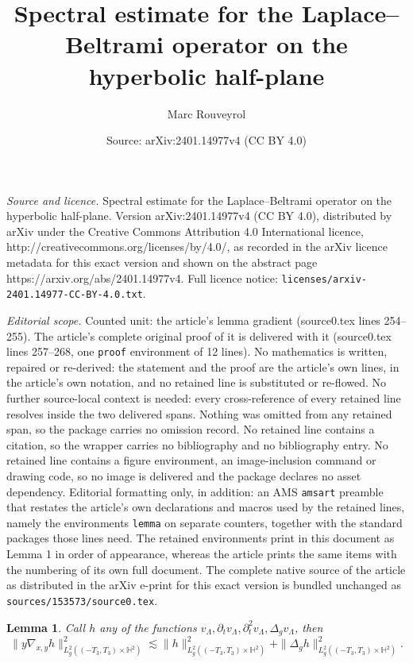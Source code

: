 \documentclass[10pt,a4paper]{amsart}
\title{Spectral estimate for the Laplace--Beltrami operator on the hyperbolic half-plane}
\author{Marc Rouveyrol}
\date{Source: arXiv:2401.14977v4 (CC BY 4.0)}
\newtheorem{lemma}{Lemma}
\begin{document}
\maketitle

\noindent\emph{Source and licence.} Spectral estimate for the Laplace--Beltrami operator on the hyperbolic half-plane. Version arXiv:2401.14977v4 (CC BY 4.0), distributed by arXiv under the Creative Commons Attribution 4.0 International licence, http://creativecommons.org/licenses/by/4.0/, as recorded in the arXiv licence metadata for this exact version and shown on the abstract page https://arxiv.org/abs/2401.14977v4. Full licence notice: \texttt{licenses/arxiv-2401.14977-CC-BY-4.0.txt}.\par\smallskip

\noindent\textit{Editorial scope.} Counted unit: the article's lemma gradient (source0.tex lines 254--255). The article's complete original proof of it is delivered with it (source0.tex lines 257--268, one \texttt{proof} environment of 12 lines). No mathematics is written, repaired or re-derived: the statement and the proof are the article's own lines, in the article's own notation, and no retained line is substituted or re-flowed.  No further source-local context is needed: every cross-reference of every retained line resolves inside the two delivered spans.  Nothing was omitted from any retained span, so the package carries no omission record.  No retained line contains a citation, so the wrapper carries no bibliography and no bibliography entry.  No retained line contains a figure environment, an image-inclusion command or drawing code, so no image is delivered and the package declares no asset dependency.  Editorial formatting only, in addition: an AMS \texttt{amsart} preamble that restates the article's own declarations and macros used by the retained lines, namely the environments \texttt{lemma} on separate counters, together with the standard packages those lines need.  The retained environments print in this document as Lemma 1 in order of appearance, whereas the article prints the same items with the numbering of its own full document.  The complete native source of the article as distributed in the arXiv e-print for this exact version is bundled unchanged as \texttt{sources/153573/source0.tex}.
\begin{lemma}\label{lemma: gradient}
Call $h$ any of the functions $v_\Lambda, \partial_t v_\Lambda, \partial_t^2 v_\Lambda, \Delta_g v_\Lambda$, then $$\|y\nabla_{x,y} h \|_{L^2_g((-T_3, T_3) \times \mathbb{H}^2)}^2 \lesssim \|h\|_{L^2_g((-T_3, T_3) \times \mathbb{H}^2)}^2 + \|\Delta_g h\|_{L^2_g((-T_3,T_3) \times \mathbb{H}^2)}^2.$$\end{lemma}
\end{document}
